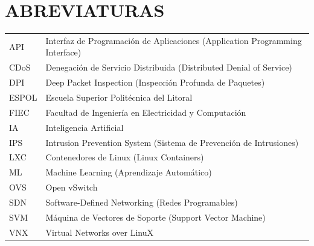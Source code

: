 \chapter{ABREVIATURAS}
\renewcommand{\arraystretch}{1.5}
\begin{table}[htbp]
\begin{tabular}{ll}
API   & Interfaz de Programaci\'on de Aplicaciones (Application Programming Interface) \\
CDoS  & Denegaci\'on de Servicio Distribuida (Distributed Denial of Service) \\
DPI   & Deep Packet Inspection (Inspecci\'on Profunda de Paquetes) \\
ESPOL & Escuela Superior Polit\'ecnica del Litoral \\
FIEC  & Facultad de Ingenier\'ia en Electricidad y Computaci\'on \\
IA    & Inteligencia Artificial \\
IPS   & Intrusion Prevention System (Sistema de Prevenci\'on de Intrusiones) \\
LXC   & Contenedores de Linux (Linux Containers) \\
ML    & Machine Learning (Aprendizaje Autom\'atico) \\
OVS   & Open vSwitch \\
SDN   & Software-Defined Networking (Redes Programables) \\
SVM   & M\'aquina de Vectores de Soporte (Support Vector Machine) \\
VNX   & Virtual Networks over LinuX \\
\end{tabular}
\end{table}